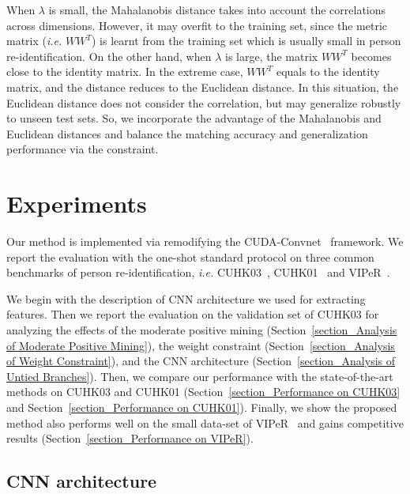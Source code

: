 \documentclass[runningheads]{llncs}
\begin{document}
When $\lambda$ is small, the Mahalanobis distance takes into account the correlations across dimensions.
However, it may overfit to the training set, since the metric matrix (\emph{i.e.} $WW^T$) is learnt from the training set which is usually small in person re-identification.
On the other hand, when $\lambda$ is large, the matrix $WW^T$ becomes close to the identity matrix.
In the extreme case, $WW^T$ equals to the identity matrix, and the distance
reduces to the Euclidean distance.
In this situation, the Euclidean distance does not consider the correlation, but may generalize robustly to unseen test sets.
So, we incorporate the advantage of the Mahalanobis and Euclidean distances and balance the matching accuracy and generalization performance via the constraint.












\section{Experiments}
\label{section_Experiments}

Our method is implemented via remodifying the CUDA-Convnet~\cite{krizhevsky2012imagenet} framework.
We report the evaluation with the one-shot standard protocol on three common benchmarks of person re-identification, \emph{i.e.} CUHK03~\cite{li2014deepreid}, CUHK01~\cite{li2012human} and VIPeR~\cite{gray2007evaluating}.

We begin with the description of CNN architecture we used for extracting features.
Then we report the evaluation on the validation set of CUHK03 for analyzing the effects of the moderate positive mining (Section~\ref{section_Analysis of Moderate Positive Mining}), the weight constraint (Section~\ref{section_Analysis of Weight Constraint}), and the CNN architecture (Section~\ref{section_Analysis of Untied Branches}).
Then, we compare our performance with the state-of-the-art methods on CUHK03 and CUHK01 (Section~\ref{section_Performance on CUHK03} and Section~\ref{section_Performance on CUHK01}).
Finally, we show the proposed method also performs well on the small data-set of VIPeR~\cite{gray2007evaluating} and gains competitive results (Section~\ref{section_Performance on VIPeR}).

\subsection{CNN architecture}
\label{section_CNN architecture}
\end{document}
